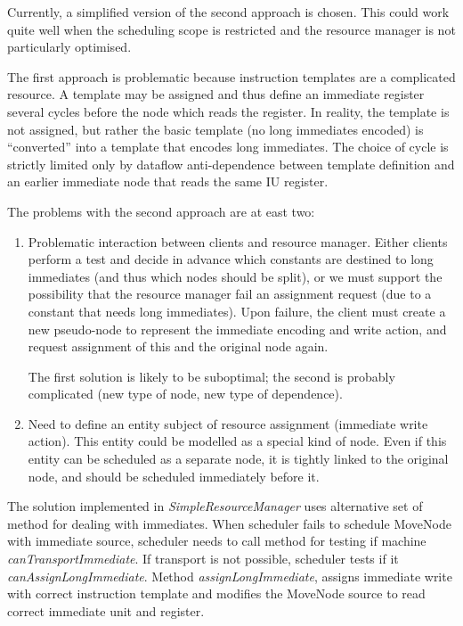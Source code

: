 \documentclass[a4paper,twoside]{tce}
\begin{document}
Currently, a simplified version of the second approach is chosen. This could
work quite well when the scheduling scope is restricted and the resource
manager is not particularly optimised.

The first approach is problematic because instruction templates are a
complicated resource. A template may be assigned and thus define an
immediate register several cycles before the node which reads the register.
In reality, the template is not assigned, but rather the basic template (no
long immediates encoded) is ``converted'' into a template that encodes long
immediates. The choice of cycle is strictly limited only by dataflow
anti-dependence between template definition and an earlier immediate node
that reads the same IU register.

The problems with the second approach are at east two:
\begin{enumerate}
\item%
  Problematic interaction between clients and resource manager. Either
  clients perform a test and decide in advance which constants are destined
  to long immediates (and thus which nodes should be split), or we must
  support the possibility that the resource manager fail an assignment
  request (due to a constant that needs long immediates). Upon failure, the
  client must create a new pseudo-node to represent the immediate encoding
  and write action, and request assignment of this and the original node
  again.

  The first solution is likely to be suboptimal; the second is probably
  complicated (new type of node, new type of dependence).
\item%
  Need to define an entity subject of resource assignment (immediate write
  action). This entity could be modelled as a special kind of node. Even if
  this entity can be scheduled as a separate node, it is tightly linked to
  the original node, and should be scheduled immediately before it.
\end{enumerate}
The solution implemented in \emph{SimpleResourceManager} uses alternative set
of method for dealing with immediates.
When scheduler fails to schedule MoveNode with immediate source, scheduler
needs to call method for testing if machine \emph{canTransportImmediate}.
If transport is not possible, scheduler tests if it \emph{canAssignLongImmediate}.
Method \emph{assignLongImmediate}, assigns immediate write with correct instruction
template and modifies the MoveNode source to read correct immediate unit and register.
\end{document}
